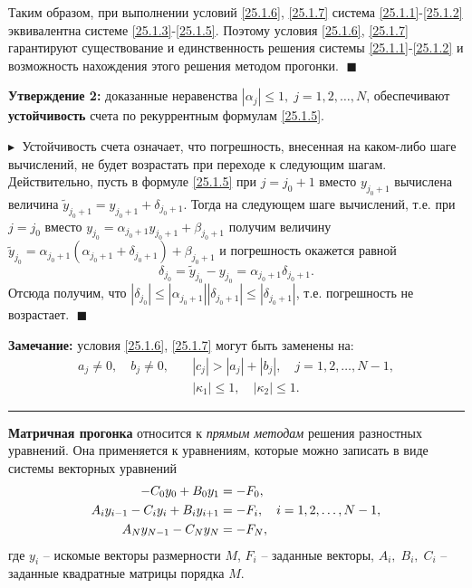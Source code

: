 Таким образом, при выполнении условий \eqref{25.1.6}, \eqref{25.1.7} система \eqref{25.1.1}-\eqref{25.1.2} эквивалентна системе \eqref{25.1.3}-\eqref{25.1.5}. Поэтому условия \eqref{25.1.6}, \eqref{25.1.7} гарантируют существование и единственность решения системы \eqref{25.1.1}-\eqref{25.1.2} и возможность нахождения этого решения методом прогонки. $\;\blacksquare$

\textbf{Утверждение 2:\;} доказанные неравенства $|\alpha_j| \leq 1, \; j = 1, 2, \ldots, N$, обеспечивают \textbf{устойчивость} счета по рекуррентным формулам \eqref{25.1.5}. 

$\blacktriangleright\;$ Устойчивость счета означает, что погрешность, внесенная на каком-либо шаге вычислений, не будет возрастать при переходе к следующим шагам. Действительно, пусть в формуле \eqref{25.1.5} при $j = j_0 + 1$ вместо $y_{j_0+1}$ вычислена величина $\widetilde{y}_{j_0+1} = y_{j_0+1} + \delta_{j_0+1}$. Тогда на следующем шаге вычислений, т.е. при $j = j_0$ вместо $y_{j_0} = \alpha_{j_0+1}y_{j_0+1} + \beta_{j_0+1}$ получим величину $\widetilde{y}_{j_0} = \alpha_{j_0+1}(\alpha_{j_0+1} + \delta_{j_0+1}) + \beta_{j_0+1}$ и погрешность окажется равной 
$$
\delta_{j_0} = \widetilde{y}_{j_0} - y_{j_0} = \alpha_{j_0+1}\delta_{j_0+1}.
$$
Отсюда получим, что $|\delta_{j_0}| \leq |\alpha_{j_0+1}| |\delta_{j_0+1}| \leq |\delta_{j_0+1}| $, т.е. погрешность не возрастает. $\;\blacksquare$

\textbf{Замечание:} условия \eqref{25.1.6}, \eqref{25.1.7} могут быть заменены на: 
\begin{align*} 
    a_j \ne 0, \quad b_j \ne 0,\quad &|c_j| > |a_j| + |b_j|, \quad j = 1, 2, \ldots, N-1,\\
    &|\kappa_1| \leq 1, \quad |\kappa_2| \leq 1.
\end{align*}

\rule{275pt}{0.5pt} 

\textbf{Матричная прогонка} относится к \textit{прямым методам} решения разностных уравнений. Она применяется к уравнениям, которые можно записать в виде системы векторных уравнений 
\setcounter{equation}{0}
\begin{align}
    -C_0 y_0 + B_0 y_1 &= - F_0,\notag \\
    A_i y_{i-1} - C_i y_i + B_i y_{i+1} &= - F_i, \quad i = 1, 2, \ldots, N-1, \label{25.1}\\
    A_N y_{N-1} - C_N y_N &= - F_N,\notag
\end{align}
где $y_i$ -- искомые векторы размерности $M$, $F_i$ -- заданные векторы, $A_i, \; B_i, \; C_i$ -- заданные квадратные матрицы порядка $M$.

